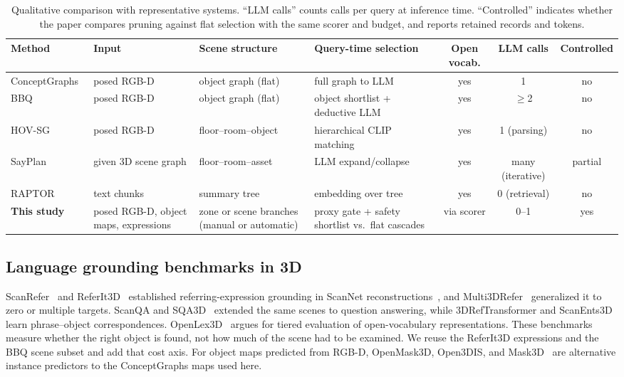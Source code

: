 \documentclass{ieeeaccess}
\begin{document}
\begin{table}[!t]
\centering
\caption{Qualitative comparison with representative systems. ``LLM calls''
counts calls per query at inference time. ``Controlled'' indicates whether the
paper compares pruning against flat selection with the same scorer and budget,
and reports retained records and tokens.}
\label{tab:qualitative}
\footnotesize
\setlength{\tabcolsep}{4pt}
\begin{tabular}{p{}p{}p{}p{}ccc}
\toprule
Method & Input & Scene structure & Query-time selection & Open vocab. &
LLM calls & Controlled \\
\midrule
ConceptGraphs~\cite{gu2023conceptgraphs} & posed RGB-D & object graph (flat) &
full graph to LLM & yes & 1 & no \\
BBQ~\cite{bbq2024} & posed RGB-D & object graph (flat) & object shortlist +
deductive LLM & yes & $\geq$2 & no \\
HOV-SG~\cite{hovsg2024} & posed RGB-D & floor--room--object & hierarchical CLIP
matching & yes & 1 (parsing) & no \\
SayPlan~\cite{rana2023sayplan} & given 3D scene graph & floor--room--asset & LLM
expand/collapse & yes & many (iterative) & partial \\
RAPTOR~\cite{raptor2024} & text chunks & summary tree & embedding over tree &
yes & 0 (retrieval) & no \\
\textbf{This study} & posed RGB-D, object maps, expressions & zone or scene
branches (manual or automatic) & proxy gate + safety shortlist vs.\ flat
cascades & via scorer & 0--1 & yes \\
\bottomrule
\end{tabular}
\end{table}

\subsection{Language grounding benchmarks in 3D}
ScanRefer~\cite{scanrefer2020} and ReferIt3D~\cite{referit3d2020} established
referring-expression grounding in ScanNet reconstructions~\cite{scannet2017},
and Multi3DRefer~\cite{multi3drefer2023} generalized it to zero or multiple
targets. ScanQA and SQA3D~\cite{scanqa2021,sqa3d2022} extended the same scenes to
question answering, while 3DRefTransformer and ScanEnts3D
\cite{reftransformer2022,scanents3d2024} learn phrase--object correspondences.
OpenLex3D~\cite{openlex3d2025} argues for tiered evaluation of open-vocabulary
representations. These benchmarks measure whether the right object is found,
not how much of the scene had to be examined. We reuse the ReferIt3D expressions
and the BBQ scene subset and add that cost axis. For object maps predicted from
RGB-D, OpenMask3D, Open3DIS, and Mask3D~\cite{openmask3d2023,open3dis2024,
mask3d2023} are alternative instance predictors to the ConceptGraphs maps used
here.
\end{document}
